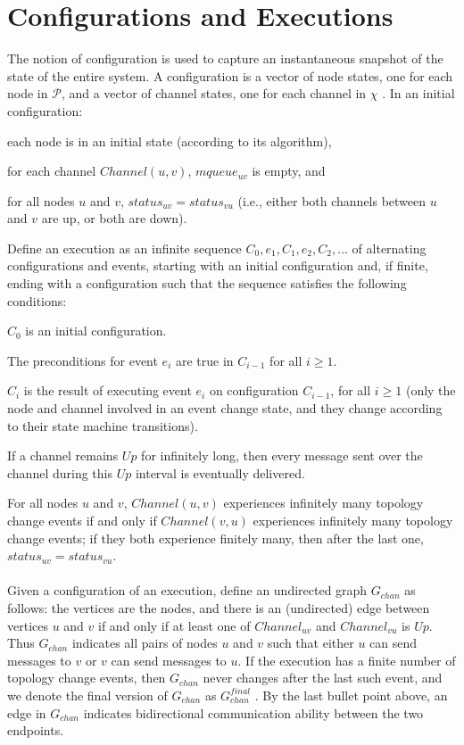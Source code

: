 	\section{Configurations and Executions}
The notion of configuration is used to capture an instantaneous snapshot of the state of the entire system. A configuration is a vector of node states, one for each node in $\mathcal{P}$, and a vector of channel states, one for each channel in $\chi$ . In an initial configuration:
\begin{list}{--}{}
	\item each node is in an initial state (according to its algorithm),
	\item for each channel $Channel(u, v)$, $mqueue_{uv}$ is empty, and
	\item for all nodes $u$ and $v$, $status_{uv} = status_{vu}$ (i.e., either both channels between $u$ and $v$ are up, or both are down).
\end{list}
Define an execution as an infinite sequence $C_0, e_1 ,C_1, e_2 ,C_2,...$ of alternating configurations and events, starting with an initial configuration and, if finite, ending with a configuration such that the sequence satisfies the following conditions:
\begin{list}{--}{}
\item  $C_0$ is an initial configuration.
\item The preconditions for event $e_i$ are true in $C_{i-1}$ for all $i\geq 1$.
\item $C_i$ is the result of executing event $e_i$ on configuration $C_{i-1}$, for all $i\geq 1$ (only the node and channel involved in an event change state, and they change according to their state machine transitions).
\item If a channel remains $Up$ for infinitely long, then every message sent over the channel during this $Up$ interval is eventually delivered.
\item For all nodes $u$ and $v$, $Channel(u, v)$ experiences infinitely many topology change events if and only if $Channel(v, u)$ experiences infinitely many topology change events; if they both experience finitely many, then after the last one, $status_{uv} = status_{vu}$.
\end{list}
\paragraph{}Given a configuration of an execution, define an undirected graph $G_{chan}$ as follows: the vertices are the nodes, and there is an (undirected) edge between vertices $u$ and $v$ if and only if at least one of $Channel_{uv}$ and $Channel_{vu}$ is $Up$. Thus $G_{chan}$ indicates all pairs of nodes $u$ and $v$ such that either $u$ can send messages to $v$ or $v$ can send messages to $u$. If the execution has a finite number of topology change events, then $G_{chan}$ never changes after the last such event, and we denote the final version of $G_{chan}$ as $G_{chan} ^{final}$ . By the last bullet point above, an edge in $G_{chan}$ indicates bidirectional communication ability between the two endpoints.
